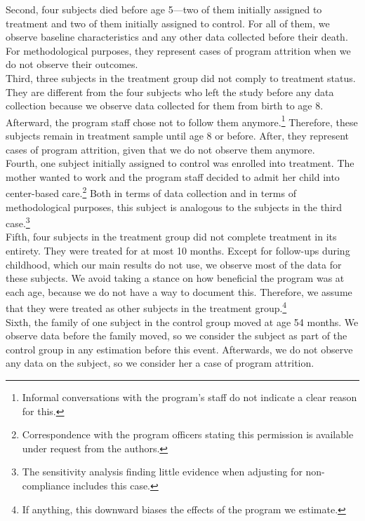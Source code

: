 \noindent Second, four subjects died before age 5---two of them initially assigned to treatment and two of them initially assigned to control. For all of them, we observe baseline characteristics and any other data collected before their death. For methodological purposes, they represent cases of program attrition when we do not observe their outcomes.\\

\noindent Third, three subjects in the treatment group did not comply to treatment status. They are different from the four subjects who left the study before any data collection because we observe data collected for them from birth to age 8. Afterward, the program staff chose not to follow them anymore.\footnote{Informal conversations with the program's staff do not indicate a clear reason for this.} Therefore, these subjects remain in treatment sample until age 8 or before. After, they represent cases of program attrition, given that we do not observe them anymore.\\



\noindent Fourth, one subject initially assigned to control was enrolled into treatment. The mother wanted to work and the program staff decided to admit her child into center-based care.\footnote{Correspondence with the program officers stating this permission is available under request from the authors.} Both in terms of data collection and in terms of methodological purposes, this subject is analogous to the subjects in the third case.\footnote{The sensitivity analysis finding little evidence when adjusting for non-compliance includes this case.}\\

\noindent Fifth, four subjects in the treatment group did not complete treatment in its entirety. They were treated for at most 10 months. Except for follow-ups during childhood, which our main results do not use, we observe most of the data for these subjects. We avoid taking a stance on how beneficial the program was at each age, because we do not have a way to document this. Therefore, we assume that they were treated as other subjects in the treatment group.\footnote{If anything, this downward biases the effects of the program we estimate.} \\

\noindent Sixth, the family of one subject in the control group moved at age 54 months. We observe data before the family moved, so we consider the subject as part of the control group in any estimation before this event. Afterwards, we do not observe any data on the subject, so we consider her a case of program attrition.\\


